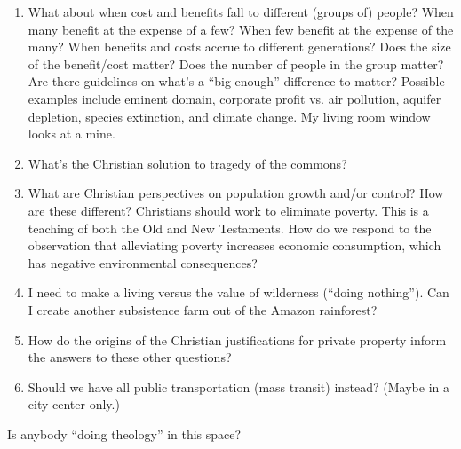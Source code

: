 \documentclass[12pt]{article}
\begin{document}
\begin{enumerate}
\item What about when cost and benefits fall to different (groups of) people? When many benefit at the expense of a few? When few benefit at the expense of the many? When benefits and costs accrue to different generations? Does the size of the benefit/cost matter? Does the number of people in the group matter? Are there guidelines on what’s a “big enough” difference to matter? Possible examples include eminent domain, corporate profit vs. air pollution, aquifer depletion, species extinction, and climate change. My living room window looks at a mine.
\item What’s the Christian solution to tragedy of the commons?
\item What are Christian perspectives on population growth and/or control? How are these different?
Christians should work to eliminate poverty. This is a teaching of both the Old and New Testaments. How do we respond to the observation that alleviating poverty increases economic consumption, which has negative environmental consequences?
\item I need to make a living versus the value of wilderness (“doing nothing”). Can I create another subsistence farm out of the Amazon rainforest?
\item How do the origins of the Christian justifications for private property inform the answers to these other questions?

\item Should we have all public transportation (mass transit) instead? (Maybe in a city center only.)
\end{enumerate}
%
Is anybody “doing theology” in this space?



\printbibliography
\end{document}
